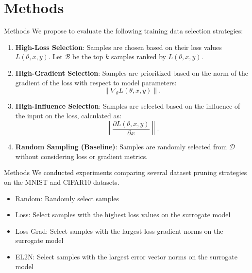 \documentclass{ctexbeamer}
\begin{document}
\section{Methods}
\begin{frame}[allowframebreaks]{Methods}
    We propose to evaluate the following training data selection strategies:
    \begin{enumerate}
        \item \textbf{High-Loss Selection}\cite{Loss}: Samples are chosen based on their loss values $L(\theta, x, y)$. Let $\mathcal{B}$ be the top $k$ samples ranked by $L(\theta, x, y)$.
        \item \textbf{High-Gradient Selection}\cite{Gradient}: Samples are prioritized based on the norm of the gradient of the loss with respect to model parameters:
        \[\|\nabla_\theta L(\theta, x, y)\|.\]
        \item \textbf{High-Influence Selection}\cite{Influence}: Samples are selected based on the influence of the input on the loss, calculated as:
        \[\left\|\frac{\partial L(\theta, x, y)}{\partial x}\right\|.\]
        \item \textbf{Random Sampling (Baseline)}: Samples are randomly selected from $\mathcal{D}$ without considering loss or gradient metrics.
    \end{enumerate}
\end{frame}

\begin{frame}{Methods}
    We conducted experiments comparing several dataset pruning strategies on the MNIST and CIFAR10 datasets.
    \begin{itemize}
        \item Random: Randomly select samples
        \item Loss: Select samples with the highest loss values on the surrogate model
        \item Loss-Grad: Select samples with the largest loss gradient norms on the surrogate model
        \item EL2N\cite{paul2021deep}: Select samples with the largest error vector norms on the surrogate model
    \end{itemize}
\end{frame}
\end{document}
